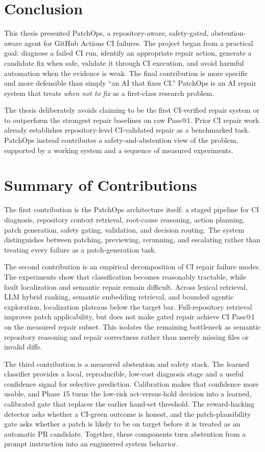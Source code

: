 \section{Conclusion}

This thesis presented PatchOps, a repository-aware, safety-gated, abstention-aware agent for GitHub Actions CI
failures. The project began from a practical goal: diagnose a failed CI run, identify an appropriate repair
action, generate a candidate fix when safe, validate it through CI execution, and avoid harmful automation when
the evidence is weak. The final contribution is more specific and more defensible than simply ``an AI that fixes
CI.'' PatchOps is an AI repair system that treats \emph{when not to fix} as a first-class research problem.

The thesis deliberately avoids claiming to be the first CI-verified repair system or to outperform the strongest
repair baselines on raw Pass@1. Prior CI repair work already establishes repository-level CI-validated repair as
a benchmarked task. PatchOps instead contributes a safety-and-abstention view of the problem, supported by a
working system and a sequence of measured experiments.

\section{Summary of Contributions}

The first contribution is the PatchOps architecture itself: a staged pipeline for CI diagnosis, repository
context retrieval, root-cause reasoning, action planning, patch generation, safety gating, validation, and
decision routing. The system distinguishes between patching, previewing, rerunning, and escalating rather than
treating every failure as a patch-generation task.

The second contribution is an empirical decomposition of CI repair failure modes. The experiments show that
classification becomes reasonably tractable, while fault localization and semantic repair remain difficult.
Across lexical retrieval, LLM hybrid ranking, semantic embedding retrieval, and bounded agentic exploration,
localization plateaus below the target bar. Full-repository retrieval improves patch applicability, but does not
make gated repair achieve CI Pass@1 on the measured repair subset. This isolates the remaining bottleneck as
semantic repository reasoning and repair correctness rather than merely missing files or invalid diffs.

The third contribution is a measured abstention and safety stack. The learned classifier provides a local,
reproducible, low-cost diagnosis stage and a useful confidence signal for selective prediction. Calibration
makes that confidence more usable, and Phase 15 turns the low-risk act-versus-hold decision into a learned,
calibrated gate that replaces the earlier hand-set threshold. The reward-hacking detector asks whether a
CI-green outcome is honest, and the patch-plausibility gate asks whether a patch is likely to be on target
before it is treated as an automatic PR candidate. Together, these components turn abstention from a prompt
instruction into an engineered system behavior.

